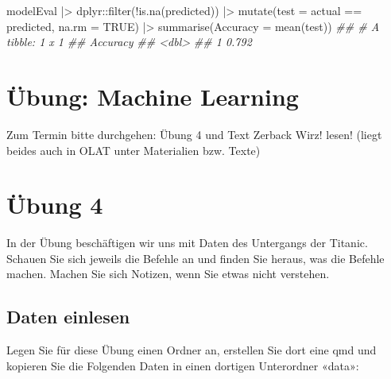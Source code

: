 \documentclass[
  10pt,
  letterpaper,
  a4paper, twoside]{scrreprt}
\newenvironment{Shaded}{\begin{snugshade}}{\end{snugshade}}
\newcommand{\AttributeTok}[1]{\textcolor[rgb]{0.40,0.45,0.13}{#1}}
\newcommand{\ConstantTok}[1]{\textcolor[rgb]{0.56,0.35,0.01}{#1}}
\newcommand{\DocumentationTok}[1]{\textcolor[rgb]{0.37,0.37,0.37}{\textit{#1}}}
\newcommand{\FunctionTok}[1]{\textcolor[rgb]{0.28,0.35,0.67}{#1}}
\newcommand{\NormalTok}[1]{\textcolor[rgb]{0.00,0.23,0.31}{#1}}
\newcommand{\SpecialCharTok}[1]{\textcolor[rgb]{0.37,0.37,0.37}{#1}}
\begin{document}
\begin{Shaded}
\begin{Highlighting}[]

\NormalTok{modelEval }\SpecialCharTok{|\textgreater{}} 
\NormalTok{  dplyr}\SpecialCharTok{::}\FunctionTok{filter}\NormalTok{(}\SpecialCharTok{!}\FunctionTok{is.na}\NormalTok{(predicted)) }\SpecialCharTok{|\textgreater{}} 
  \FunctionTok{mutate}\NormalTok{(}\AttributeTok{test =}\NormalTok{ actual }\SpecialCharTok{==}\NormalTok{ predicted, }\AttributeTok{na.rm =} \ConstantTok{TRUE}\NormalTok{) }\SpecialCharTok{|\textgreater{}} 
  \FunctionTok{summarise}\NormalTok{(}\AttributeTok{Accuracy =} \FunctionTok{mean}\NormalTok{(test)) }
\DocumentationTok{\#\# \# A tibble: 1 x 1}
\DocumentationTok{\#\#   Accuracy}
\DocumentationTok{\#\#      \textless{}dbl\textgreater{}}
\DocumentationTok{\#\# 1    0.792}
\end{Highlighting}
\end{Shaded}


\chapter{Übung: Machine Learning}\label{uxfcbung-machine-learning}

Zum Termin bitte durchgehen: Übung 4 und Text Zerback Wirz! lesen!
(liegt beides auch in OLAT unter Materialien bzw. Texte)


\chapter*{Übung 4}\label{uxfcbung-4}


In der Übung beschäftigen wir uns mit Daten des Untergangs der Titanic.
Schauen Sie sich jeweils die Befehle an und finden Sie heraus, was die
Befehle machen. Machen Sie sich Notizen, wenn Sie etwas nicht verstehen.

\section*{Daten einlesen}\label{daten-einlesen-1}


Legen Sie für diese Übung einen Ordner an, erstellen Sie dort eine qmd
und kopieren Sie die Folgenden Daten in einen dortigen Unterordner
«data»:
\end{document}
